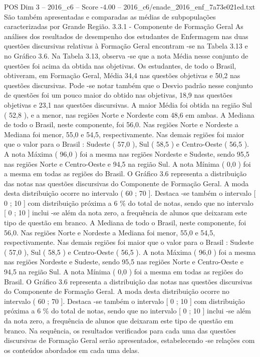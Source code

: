 \begin{textsample}{POS Dim 3 – 2016\_c6 – Score -4.00 – 2016\_c6/enade\_2016\_enf\_7a73e021ed.txt}
São também apresentadas e comparadas as médias de subpopulações caracterizadas por Grande Região. 3.3.1 - Componente de Formação Geral As análises dos resultados de desempenho dos estudantes de Enfermagem nas duas questões discursivas relativas à Formação Geral encontram -se na Tabela 3.13 e no Gráfico 3.6.
Na Tabela 3.13, observa -se que a nota Média nesse conjunto de questões foi acima da obtida nas objetivas.
Os estudantes, de todo o Brasil, obtiveram, em Formação Geral, Média 34,4 nas questões objetivas e 50,2 nas questões discursivas.
Pode -se notar também que o Desvio padrão nesse conjunto de questões foi um pouco maior do obtido nas objetivas, 18,9 nas questões objetivas e 23,1 nas questões discursivas.
A maior Média foi obtida na região Sul ( 52,8 ), e a menor, nas regiões Norte e Nordeste com 48,6 em ambas.
A Mediana de todo o Brasil, neste componente, foi 56,0.
Nas regiões Norte e Nordeste a Mediana foi menor, 55,0 e 54,5, respectivamente.
Nas demais regiões foi maior que o valor para o Brasil : Sudeste ( 57,0 ), Sul ( 58,5 ) e Centro-Oeste ( 56,5 ).
A nota Máxima ( 96,0 ) foi a mesma nas regiões Nordeste e Sudeste, sendo 95,5 nas regiões Norte e Centro-Oeste e 94,5 na região Sul.
A nota Mínima ( 0,0 ) foi a mesma em todas as regiões do Brasil.
O Gráfico 3.6 representa a distribuição das notas nas questões discursivas do Componente de Formação Geral.
A moda desta distribuição ocorre no intervalo ( 60 ; 70 ].
Destaca -se também o intervalo [ 0 ; 10 ] com distribuição próxima a 6 \% do total de notas, sendo que no intervalo [ 0 ; 10 ] inclui -se além da nota zero, a frequência de alunos que deixaram este tipo de questão em branco.
A Mediana de todo o Brasil, neste componente, foi 56,0.
Nas regiões Norte e Nordeste a Mediana foi menor, 55,0 e 54,5, respectivamente.
Nas demais regiões foi maior que o valor para o Brasil : Sudeste ( 57,0 ), Sul ( 58,5 ) e Centro-Oeste ( 56,5 ).
A nota Máxima ( 96,0 ) foi a mesma nas regiões Nordeste e Sudeste, sendo 95,5 nas regiões Norte e Centro-Oeste e 94,5 na região Sul.
A nota Mínima ( 0,0 ) foi a mesma em todas as regiões do Brasil.
O Gráfico 3.6 representa a distribuição das notas nas questões discursivas do Componente de Formação Geral.
A moda desta distribuição ocorre no intervalo ( 60 ; 70 ].
Destaca -se também o intervalo [ 0 ; 10 ] com distribuição próxima a 6 \% do total de notas, sendo que no intervalo [ 0 ; 10 ] inclui -se além da nota zero, a frequência de alunos que deixaram este tipo de questão em branco.
Na sequência, os resultados verificados para cada uma das questões discursivas de Formação Geral serão apresentados, estabelecendo -se relações com os conteúdos abordados em cada uma delas.

\end{textsample}
